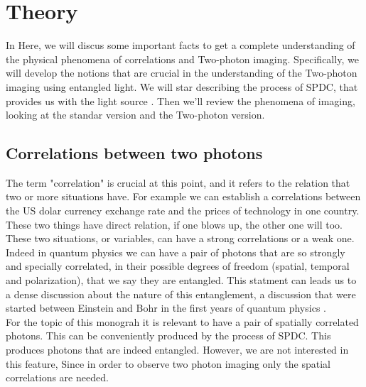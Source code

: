 
\chapter{Theory} %

\label{Chapter2} %

In Here, we will discus some important facts to get a complete understanding 
of the physical phenomena of correlations and Two-photon imaging. Specifically, we will develop the 
notions that are crucial in the understanding of the Two-photon imaging using entangled light. We will
 star describing the process of SPDC, that provides us with the light source . Then we'll review the 
phenomena of imaging, looking at the standar version and the Two-photon version. 
\section{Correlations between two photons}

The term "correlation" is crucial at this point, and it refers to the relation that two or more situations have. For example 
we can establish a correlations between the US dolar currency exchange rate and the prices of technology in one country. These two things have direct relation, if one blows up, the other one will too.
These two situations, or variables, can have a strong correlations or a weak one. \\

Indeed in quantum physics we can have a pair of photons that are so strongly and specially correlated, in their possible degrees of freedom (spatial, temporal and polarization),
that we say they are entangled. This statment can leads us 
to a dense discussion about the nature of this entanglement, 
a discussion that were started between Einstein and Bohr in the first years of quantum physics \cite{einstein}.\\

For the topic  of this monograh it is relevant to have a pair of spatially correlated  photons. This can be conveniently produced
 by the process of SPDC. This produces photons that are indeed entangled. However, we are not interested in this feature, Since in order to observe 
 two photon imaging only the spatial correlations are needed.




